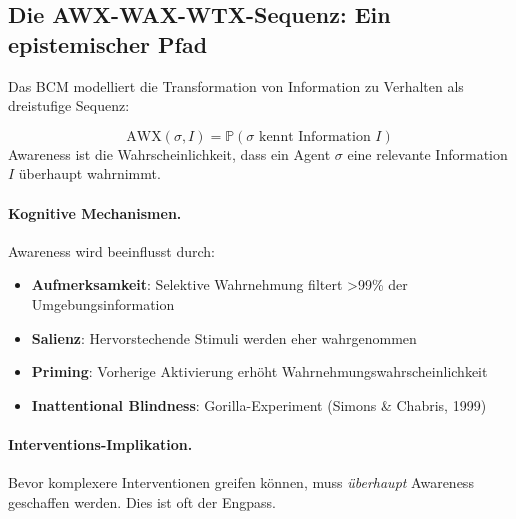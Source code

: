 \subsection{Die AWX-WAX-WTX-Sequenz: Ein epistemischer Pfad}

Das BCM modelliert die Transformation von Information zu Verhalten als dreistufige Sequenz:

\begin{axiom}
\begin{equation}
\text{AWX}(\sigma, I) = \mathbb{P}(\sigma \text{ kennt Information } I)
\end{equation}
Awareness ist die Wahrscheinlichkeit, dass ein Agent $\sigma$ eine relevante Information $I$ überhaupt wahrnimmt.

\paragraph{Kognitive Mechanismen.}
Awareness wird beeinflusst durch:
\begin{itemize}
    \item \textbf{Aufmerksamkeit}: Selektive Wahrnehmung filtert >99\% der Umgebungsinformation
    \item \textbf{Salienz}: Hervorstechende Stimuli werden eher wahrgenommen
    \item \textbf{Priming}: Vorherige Aktivierung erhöht Wahrnehmungswahrscheinlichkeit
    \item \textbf{Inattentional Blindness}: Gorilla-Experiment (Simons \& Chabris, 1999)
\end{itemize}

\paragraph{Interventions-Implikation.}
Bevor komplexere Interventionen greifen können, muss \textit{überhaupt} Awareness geschaffen werden. Dies ist oft der Engpass.
\end{axiom}

